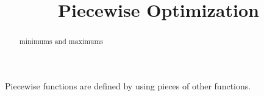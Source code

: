 \documentclass{ximera}
\title{Piecewise Optimization}
\begin{document}
\begin{abstract}
minimums and maximums
\end{abstract}
\maketitle



Piecewise functions are defined by using pieces of other functions.
\end{document}
